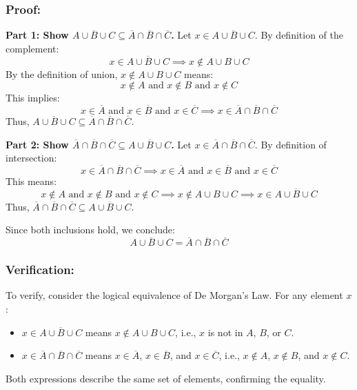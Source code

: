 \documentclass[12pt, a4paper, twoside]{report} %
\begin{document}
\subsubsection*{Proof:}
\textbf{Part 1: Show \( \overline{A \cup B \cup C} \subseteq \overline{A} \cap \overline{B} \cap \overline{C} \).}
Let \( x \in \overline{A \cup B \cup C} \). By definition of the complement:
\[
x \in \overline{A \cup B \cup C} \implies x \notin A \cup B \cup C
\]
By the definition of union, \( x \notin A \cup B \cup C \) means:
\[
x \notin A \text{ and } x \notin B \text{ and } x \notin C
\]
This implies:
\[
x \in \overline{A} \text{ and } x \in \overline{B} \text{ and } x \in \overline{C} \implies x \in \overline{A} \cap \overline{B} \cap \overline{C}
\]
Thus, \( \overline{A \cup B \cup C} \subseteq \overline{A} \cap \overline{B} \cap \overline{C} \).

\textbf{Part 2: Show \( \overline{A} \cap \overline{B} \cap \overline{C} \subseteq \overline{A \cup B \cup C} \).}
Let \( x \in \overline{A} \cap \overline{B} \cap \overline{C} \). By definition of intersection:
\[
x \in \overline{A} \cap \overline{B} \cap \overline{C} \implies x \in \overline{A} \text{ and } x \in \overline{B} \text{ and } x \in \overline{C}
\]
This means:
\[
x \notin A \text{ and } x \notin B \text{ and } x \notin C \implies x \notin A \cup B \cup C \implies x \in \overline{A \cup B \cup C}
\]
Thus, \( \overline{A} \cap \overline{B} \cap \overline{C} \subseteq \overline{A \cup B \cup C} \).

Since both inclusions hold, we conclude:
\[
\overline{A \cup B \cup C} = \overline{A} \cap \overline{B} \cap \overline{C}
\]

\subsubsection*{Verification:}
To verify, consider the logical equivalence of De Morgan’s Law. For any element \( x \):
\begin{itemize}
  \item \( x \in \overline{A \cup B \cup C} \) means \( x \notin A \cup B \cup C \), i.e., \( x \) is not in \( A \), \( B \), or \( C \).
  \item \( x \in \overline{A} \cap \overline{B} \cap \overline{C} \) means \( x \in \overline{A} \), \( x \in \overline{B} \), and \( x \in \overline{C} \), i.e., \( x \notin A \), \( x \notin B \), and \( x \notin C \).
\end{itemize}
Both expressions describe the same set of elements, confirming the equality.
\end{document}
